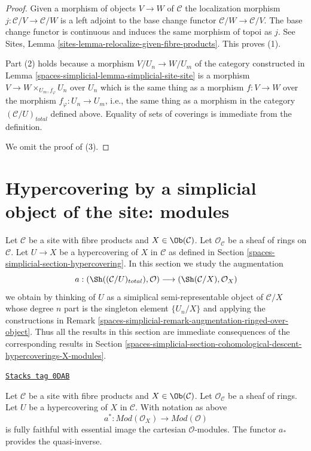 \begin{proof}
Given a morphism of objects $V \to W$ of $\mathcal{C}$ the localization
morphism $j : \mathcal{C}/V \to \mathcal{C}/W$ is a left adjoint to
the base change functor $\mathcal{C}/W \to \mathcal{C}/V$.
The base change functor is continuous and induces the same morphism of
topoi as $j$. See
Sites, Lemma \ref{sites-lemma-relocalize-given-fibre-products}.
This proves (1).

\medskip\noindent
Part (2) holds because a morphism $V/U_n \to W/U_m$
of the category constructed
in Lemma \ref{spaces-simplicial-lemma-simplicial-site-site}
is a morphism $V \to W \times_{U_m, f_\varphi} U_n$ over $U_n$
which is the same thing as a morphism $f : V \to W$
over the morphism $f_\varphi : U_n \to U_m$, i.e.,
the same thing as a morphism in the category $(\mathcal{C}/U)_{total}$
defined above. Equality of sets of coverings is
immediate from the definition.

\medskip\noindent
We omit the proof of (3).
\end{proof}

\section{Hypercovering by a simplicial object of the site: modules}
\label{spaces-simplicial-section-hypercovering-modules}
Let $\mathcal{C}$ be a site with fibre products and $X \in \Ob(\mathcal{C})$.
Let $\mathcal{O}_\mathcal{C}$ be a sheaf of rings on $\mathcal{C}$.
Let $U \to X$ be a hypercovering of $X$ in $\mathcal{C}$ as defined
in Section \ref{spaces-simplicial-section-hypercovering}. In this section we study the
augmentation
$$
a :
(\Sh((\mathcal{C}/U)_{total}), \mathcal{O})
\longrightarrow
(\Sh(\mathcal{C}/X), \mathcal{O}_X)
$$
we obtain by thinking of $U$ as a simiplical semi-representable
object of $\mathcal{C}/X$ whose degree $n$ part is the singleton
element $\{U_n/X\}$ and applying the constructions in
Remark \ref{spaces-simplicial-remark-augmentation-ringed-over-object}.
Thus all the results in this section are immediate consequences
of the corresponding results in
Section \ref{spaces-simplicial-section-cohomological-descent-hypercoverings-X-modules}.

\begin{lemma}
\label{spaces-simplicial-lemma-hypercovering-X-simple-descent-modules}
\href{https://stacks.math.columbia.edu/tag/0DAB}{\texttt{Stacks tag 0DAB}}

Let $\mathcal{C}$ be a site with fibre products and $X \in \Ob(\mathcal{C})$.
Let $\mathcal{O}_\mathcal{C}$ be a sheaf of rings.
Let $U$ be a hypercovering of $X$ in $\mathcal{C}$. With notation as above
$$
a^* : \textit{Mod}(\mathcal{O}_X) \to \textit{Mod}(\mathcal{O})
$$
is fully faithful with essential image the cartesian $\mathcal{O}$-modules.
The functor $a_*$ provides the quasi-inverse.
\end{lemma}

